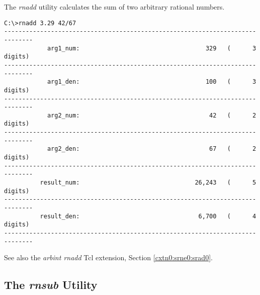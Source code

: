 \begin{dosutilcommandsynopsis}
\end{dosutilcommandsynopsis}

\begin{dosutilcommanddescription}
The \emph{rnadd} utility calculates the sum of two arbitrary
rational numbers.
\end{dosutilcommanddescription}

\begin{dosutilcommandsampleinvocations}
\begin{scriptsize}
\begin{verbatim}
C:\>rnadd 3.29 42/67
------------------------------------------------------------------------------
            arg1_num:                                   329   (      3 digits)
------------------------------------------------------------------------------
            arg1_den:                                   100   (      3 digits)
------------------------------------------------------------------------------
            arg2_num:                                    42   (      2 digits)
------------------------------------------------------------------------------
            arg2_den:                                    67   (      2 digits)
------------------------------------------------------------------------------
          result_num:                                26,243   (      5 digits)
------------------------------------------------------------------------------
          result_den:                                 6,700   (      4 digits)
------------------------------------------------------------------------------
\end{verbatim}
\end{scriptsize}
\end{dosutilcommandsampleinvocations}

\begin{dosutilcommandseealso}
See also the \emph{arbint rnadd} Tcl extension, 
Section \cxtnzeroxrefhyphen{}\ref{cxtn0:srne0:srad0}.
\end{dosutilcommandseealso}


\subsection{The \emph{rnsub} Utility}
\label{cdcm0:srnu0:srsb0}

